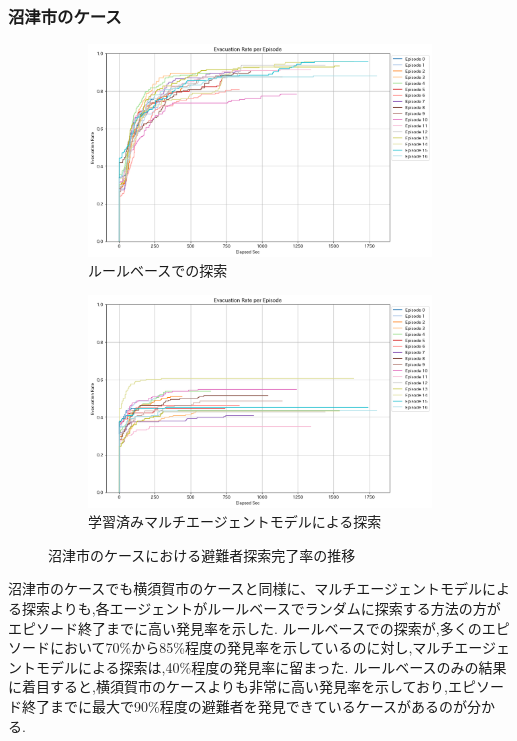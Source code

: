 \subsubsection{沼津市のケース}
\begin{figure}[H]
  \centering
  \begin{subfigure}{0.45\textwidth}
      \centering
      \includegraphics[width=\textwidth]{Figures/NumazuSearch-RuleResult.png}
      \caption{ルールベースでの探索}
      \label{fig:YokosukaModel-Result2}
  \end{subfigure}
  \begin{subfigure}{0.45\textwidth}
      \centering
      \includegraphics[width=\textwidth]{Figures/NumazuSearch-AgentsResult.png}
      \caption{学習済みマルチエージェントモデルによる探索}
      \label{fig:NumazuModel-Result2}
  \end{subfigure}
  \caption{沼津市のケースにおける避難者探索完了率の推移}
  \label{fig:Model-Result-Errors}
\end{figure}
沼津市のケースでも横須賀市のケースと同様に、マルチエージェントモデルによる探索よりも,各エージェントがルールベースでランダムに探索する方法の方がエピソード終了までに高い発見率を示した.
ルールベースでの探索が,多くのエピソードにおいて70\%から85\%程度の発見率を示しているのに対し,マルチエージェントモデルによる探索は,40\%程度の発見率に留まった.
ルールベースのみの結果に着目すると,横須賀市のケースよりも非常に高い発見率を示しており,エピソード終了までに最大で90\%程度の避難者を発見できているケースがあるのが分かる.

